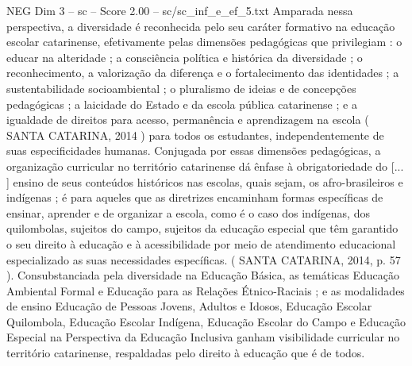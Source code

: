 \begin{textsample}{NEG Dim 3 – sc – Score 2.00 – sc/sc\_inf\_e\_ef\_5.txt}
Amparada nessa perspectiva, a diversidade é reconhecida pelo seu caráter formativo na educação escolar catarinense, efetivamente pelas dimensões pedagógicas que privilegiam : o educar na alteridade ; a consciência política e histórica da diversidade ; o reconhecimento, a valorização da diferença e o fortalecimento das identidades ; a sustentabilidade socioambiental ; o pluralismo de ideias e de concepções pedagógicas ; a laicidade do Estado e da escola pública catarinense ; e a igualdade de direitos para acesso, permanência e aprendizagem na escola ( SANTA CATARINA, 2014 ) para todos os estudantes, independentemente de suas especificidades humanas.
Conjugada por essas dimensões pedagógicas, a organização curricular no território catarinense dá ênfase à obrigatoriedade do [... ] ensino de seus conteúdos históricos nas escolas, quais sejam, os afro-brasileiros e indígenas ; é para aqueles que as diretrizes encaminham formas específicas de ensinar, aprender e de organizar a escola, como é o caso dos indígenas, dos quilombolas, sujeitos do campo, sujeitos da educação especial que têm garantido o seu direito à educação e à acessibilidade por meio de atendimento educacional especializado as suas necessidades específicas. ( SANTA CATARINA, 2014, p. 57 ).
Consubstanciada pela diversidade na Educação Básica, as temáticas Educação Ambiental Formal e Educação para as Relações Étnico-Raciais ; e as modalidades de ensino Educação de Pessoas Jovens, Adultos e Idosos, Educação Escolar Quilombola, Educação Escolar Indígena, Educação Escolar do Campo e Educação Especial na Perspectiva da Educação Inclusiva ganham visibilidade curricular no território catarinense, respaldadas pelo direito à educação que é de todos.

\end{textsample}
